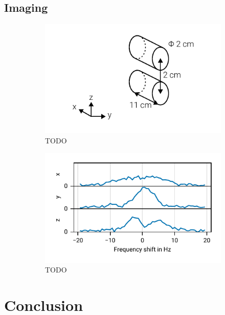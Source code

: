 \documentclass[
    parskip=half, 
    twoside=false,
    twocolumn=true,
    fontsize=11pt,
]{scrarticle}
\begin{document}
\subsection*{Imaging}
\begin{figure}
    \centering
    \begin{subfigure}[c]{.45\textwidth}
        \includegraphics{figures/sample holder.pdf}
        \caption{TODO}
    \end{subfigure}
    \begin{subfigure}[c]{.45\textwidth}
        \includegraphics{figures/07 1d imaging.pdf}
        \caption{TODO}
    \end{subfigure}
    \caption{}
\end{figure}


\section{Conclusion}

\nocite{*}
\printbibliography
\end{document}
